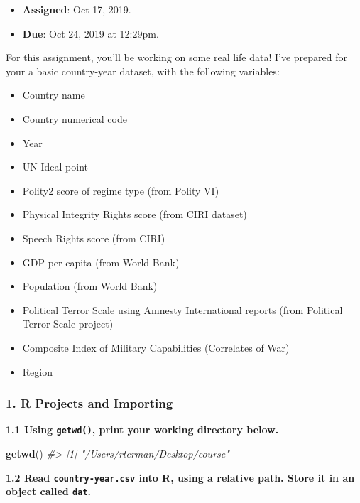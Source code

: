 \documentclass[]{book}
\newenvironment{Shaded}{\begin{snugshade}}{\end{snugshade}}
\newcommand{\CommentTok}[1]{\textcolor[rgb]{0.56,0.35,0.01}{\textit{#1}}}
\newcommand{\KeywordTok}[1]{\textcolor[rgb]{0.13,0.29,0.53}{\textbf{#1}}}
\newcommand{\NormalTok}[1]{#1}
\providecommand{\tightlist}{%
  \setlength{\itemsep}{0pt}\setlength{\parskip}{0pt}}
\begin{document}
\begin{itemize}
\tightlist
\item
  \textbf{Assigned}: Oct 17, 2019.
\item
  \textbf{Due}: Oct 24, 2019 at 12:29pm.
\end{itemize}

For this assignment, you'll be working on some real life data! I've prepared for your a basic country-year dataset, with the following variables:

\begin{itemize}
\tightlist
\item
  Country name
\item
  Country numerical code
\item
  Year
\item
  UN Ideal point
\item
  Polity2 score of regime type (from Polity VI)
\item
  Physical Integrity Rights score (from CIRI dataset)
\item
  Speech Rights score (from CIRI)
\item
  GDP per capita (from World Bank)
\item
  Population (from World Bank)
\item
  Political Terror Scale using Amnesty International reports (from Political Terror Scale project)
\item
  Composite Index of Military Capabilities (Correlates of War)
\item
  Region
\end{itemize}

\hypertarget{r-projects-and-importing}{%
\subsubsection*{1. R Projects and Importing}\label{r-projects-and-importing}}

\textbf{1.1 Using \texttt{getwd()}, print your working directory below.}

\begin{Shaded}
\begin{Highlighting}[]
\KeywordTok{getwd}\NormalTok{()}
\CommentTok{#> [1] "/Users/rterman/Desktop/course"}
\end{Highlighting}
\end{Shaded}

\textbf{1.2 Read \texttt{country-year.csv} into R, using a relative path. Store it in an object called \texttt{dat}.}
\end{document}

